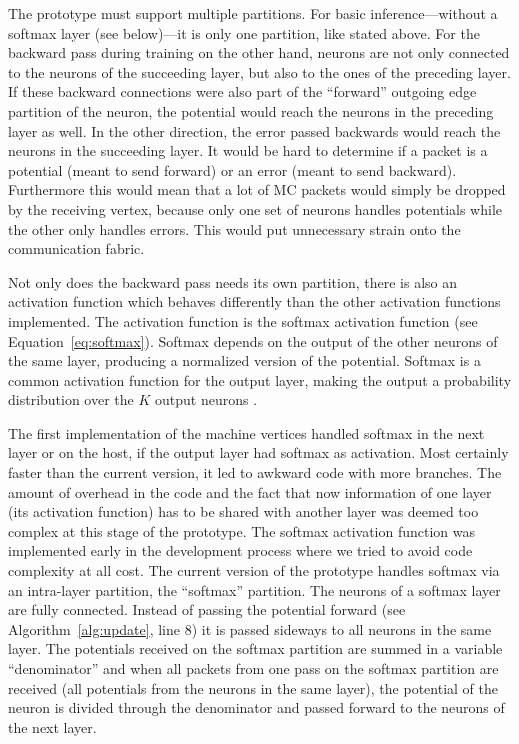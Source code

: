 \documentclass[]{article}
\begin{document}
The prototype must support multiple partitions.
For basic inference---without a softmax layer (see below)---it is only
one partition, like stated above.
For the backward pass during training on the other hand, neurons are
not only connected to the neurons of the succeeding layer, but also
to the ones of the preceding layer.
If these backward connections were also part of the ``forward''
outgoing edge partition of the neuron, the potential would reach the
neurons in the preceding layer as well.
In the other direction, the error passed backwards would reach the
neurons in the succeeding layer.
It would be hard to determine if a packet is a potential (meant to
send forward) or an error (meant to send backward).
Furthermore this would mean that a lot of MC packets would simply
be dropped by the receiving vertex, because only one set of neurons
handles potentials while the other only handles errors.
This would put unnecessary strain onto the communication fabric.

Not only does the backward pass needs its own partition, there is
also an activation function which behaves differently than the other
activation functions implemented.
The activation function is the softmax activation function
(see Equation~\ref{eq:softmax}).
Softmax depends on the output of the other neurons of the same layer,
producing a normalized version of the potential.
Softmax is a common activation function for the output layer, making
the output a probability distribution over the $K$ output neurons
\citep{goodfellow_et_al_2016}.

The first implementation of the machine vertices handled softmax
in the next layer or on the host, if the output layer had softmax as
activation.
Most certainly faster than the current version, it led to awkward
code with more branches.
The amount of overhead in the code and the fact that now information
of one layer (its activation function) has to be shared with another
layer was deemed too complex at this stage of the prototype.
The softmax activation function was implemented early in the
development process where we tried to avoid code complexity at all
cost.
The current version of the prototype handles softmax via an
intra-layer partition, the ``softmax'' partition.
The neurons of a softmax layer are fully connected.
Instead of passing the potential forward (see
Algorithm~\ref{alg:update}, line 8) it is passed sideways to all
neurons in the same layer.
The potentials received on the softmax partition are summed in a
variable ``denominator'' and when all packets from one pass on the
softmax partition are received (all potentials from the neurons in the
same layer), the potential of the neuron is divided through the
denominator and passed forward to the neurons of the next layer.
\end{document}
